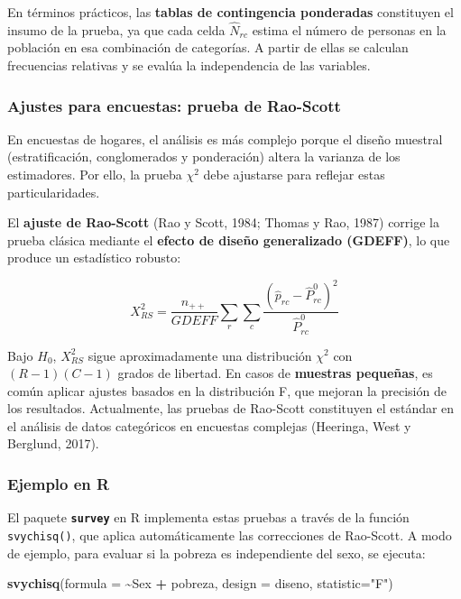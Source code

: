 \documentclass[
  12pt,
]{book}
\newenvironment{Shaded}{\begin{snugshade}}{\end{snugshade}}
\newcommand{\AttributeTok}[1]{\textcolor[rgb]{0.13,0.29,0.53}{#1}}
\newcommand{\FunctionTok}[1]{\textcolor[rgb]{0.13,0.29,0.53}{\textbf{#1}}}
\newcommand{\NormalTok}[1]{#1}
\newcommand{\SpecialCharTok}[1]{\textcolor[rgb]{0.81,0.36,0.00}{\textbf{#1}}}
\newcommand{\StringTok}[1]{\textcolor[rgb]{0.31,0.60,0.02}{#1}}
\begin{document}
En términos prácticos, las \textbf{tablas de contingencia ponderadas} constituyen el insumo de la prueba, ya que cada celda \(\hat{N}_{rc}\) estima el número de personas en la población en esa combinación de categorías. A partir de ellas se calculan frecuencias relativas y se evalúa la independencia de las variables.

\subsubsection{Ajustes para encuestas: prueba de Rao-Scott}\label{ajustes-para-encuestas-prueba-de-rao-scott}

En encuestas de hogares, el análisis es más complejo porque el diseño muestral (estratificación, conglomerados y ponderación) altera la varianza de los estimadores. Por ello, la prueba \(\chi^{2}\) debe ajustarse para reflejar estas particularidades.

El \textbf{ajuste de Rao-Scott} (Rao y Scott, 1984; Thomas y Rao, 1987) corrige la prueba clásica mediante el \textbf{efecto de diseño generalizado (GDEFF)}, lo que produce un estadístico robusto:

\[
X_{RS}^2 = \frac{n_{++}}{GDEFF} \sum_r \sum_c \frac{(\hat{p}_{rc} - \hat{P}_{rc}^0)^2}{\hat{P}_{rc}^0}
\]

Bajo \(H_0\), \(X_{RS}^2\) sigue aproximadamente una distribución \(\chi^2\) con \((R-1)(C-1)\) grados de libertad. En casos de \textbf{muestras pequeñas}, es común aplicar ajustes basados en la distribución F, que mejoran la precisión de los resultados. Actualmente, las pruebas de Rao-Scott constituyen el estándar en el análisis de datos categóricos en encuestas complejas (Heeringa, West y Berglund, 2017).

\subsubsection{Ejemplo en R}\label{ejemplo-en-r}

El paquete \textbf{\texttt{survey}} en R implementa estas pruebas a través de la función \texttt{svychisq()}, que aplica automáticamente las correcciones de Rao-Scott. A modo de ejemplo, para evaluar si la pobreza es independiente del sexo, se ejecuta:

\begin{Shaded}
\begin{Highlighting}[]
\FunctionTok{svychisq}\NormalTok{(}\AttributeTok{formula =} \SpecialCharTok{\textasciitilde{}}\NormalTok{Sex }\SpecialCharTok{+}\NormalTok{ pobreza, }\AttributeTok{design =}\NormalTok{ diseno, }\AttributeTok{statistic=}\StringTok{"F"}\NormalTok{)}
\end{Highlighting}
\end{Shaded}
\end{document}

